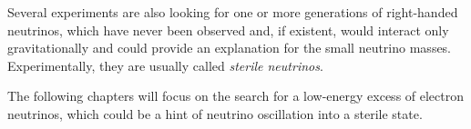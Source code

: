Several experiments are also looking for one or more generations of right-handed neutrinos, which have never been observed and, if existent, would interact only gravitationally and could provide an explanation for the small neutrino masses. Experimentally, they are usually called \emph{sterile neutrinos}.

The following chapters will focus on the search for a low-energy excess of electron neutrinos, which could be a hint of neutrino oscillation into a sterile state. 